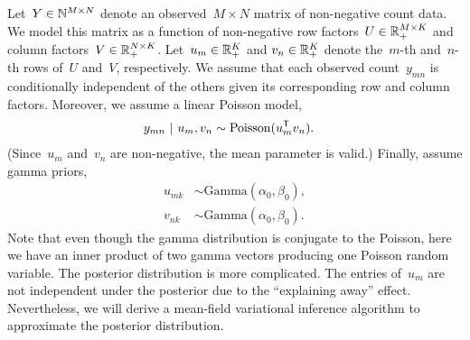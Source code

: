 \documentclass[11pt]{article}
\begin{document}
Let~$Y \in \mathbb{N}^{M \times N}$ denote an observed~$M \times N$ matrix of non-negative count data.  We model this matrix as a function of non-negative row factors~$U \in \mathbb{R}_+^{M \times K}$ and column factors~$V \in \mathbb{R}_+^{N \times K}$.  Let~$u_m \in \mathbb{R}_+^K$ and $v_n \in \mathbb{R}_+^K$ denote the~$m$-th and~$n$-th rows of~$U$ and~$V$, respectively.  We assume that each observed count~$y_{mn}$ is conditionally independent of the others given its corresponding row and column factors. Moreover, we assume a linear Poisson model,
\begin{align*}
    y_{mn} ~\vert~ u_m, v_n &\sim \mathrm{Poisson}(u_m^{\mathsf{T}} v_n).
\end{align*}
(Since~$u_m$ and~$v_n$ are non-negative, the mean parameter is valid.)  Finally, assume gamma priors,
\begin{align*}
    u_{mk} &\sim \mathrm{Gamma}(\alpha_0, \beta_0), \\
    v_{nk} &\sim \mathrm{Gamma}(\alpha_0, \beta_0).
\end{align*}
Note that even though the gamma distribution is conjugate to the Poisson, here we have an inner product of two gamma vectors producing one Poisson random variable.  The posterior distribution is more complicated.  The entries of~$u_m$ are not independent under the posterior due to the ``explaining away'' effect.  Nevertheless, we will derive a mean-field variational inference algorithm to approximate the posterior distribution.  
\end{document}
